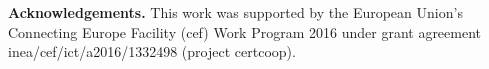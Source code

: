 \noindent
{\bf Acknowledgements.}
This work was supported by the European Union's Connecting
Europe Facility ({\sc cef}) Work Program 2016 under grant agreement
{\sc inea}/{\sc cef}/{\sc ict}/{\sc a}2016/1332498 (project {\sc certcoop}).
